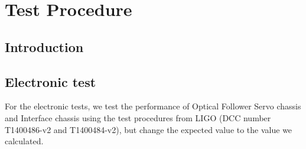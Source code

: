 
\chapter{Test Procedure} %

\label{Chapter1} %


\section{Introduction}
\section{Electronic test}
For the electronic tests, we test the performance of Optical Follower Servo chassis and Interface chassis using the test procedures from LIGO (DCC number T1400486-v2 and T1400484-v2), but change the expected value to the value we calculated.
